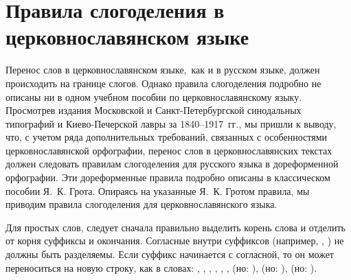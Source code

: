 \documentclass[12pt,a4paper,oneside]{extarticle}
\begin{document}
\section{Правила слогоделения в церковнославянском языке}

Перенос слов в церковнославянском языке, как и в русском языке, должен происходить на границе слогов. Однако правила слогоделения подробно не описаны ни в одном учебном пособии по церковнославянскому языку. Просмотрев издания Московской и Санкт-Петербургской синодальных типографий и Киево-Печерской лавры за 1840--1917~гг., мы пришли к выводу, что, с учетом ряда дополнительных требований, связанных с особенностями церковнославянской орфографии, перенос слов в церковнославянских текстах должен следовать правилам слогоделения для русского языка в дореформенной орфографии. Эти дореформенные правила подробно описаны в классическом пособии Я.~К. Грота\autocite[][]{grot1902}. Опираясь на указанные Я.~К. Гротом правила, мы приводим правила слогоделения для церковнославянского языка.


Для простых слов, следует сначала правильно выделить корень слова и отделить от корня суффиксы и окончания. Согласные внутри суффиксов (например, , ) не должны быть разделяемы. Если суффикс начинается с согласной, то он может переноситься на новую строку, как в словах: , , , , , ,  (но: ),  (но: ),  (но: ).
\end{document}
